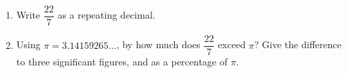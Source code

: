 \begin{enumerate}
\item[(a)] Write $\dfrac{22}{7}$ as a repeating decimal.
\item[(b)] Using $\pi=3.14159265\ldots$, by how much does $\dfrac{22}{7}$ exceed $\pi$? Give the difference to three significant figures, and as a percentage of $\pi$.
\end{enumerate}

